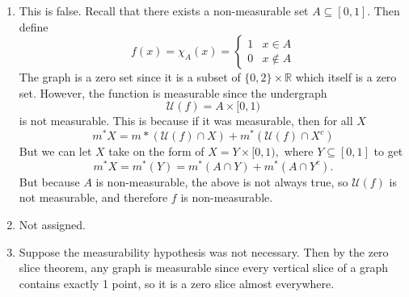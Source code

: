 \documentclass{article}
\begin{document}
\begin{enumerate}
\begin{enumerate}[label=(\alph*)]
        \item This is false. Recall that there exists a non-measurable set $A \subseteq [0,1].$ Then define 
        \begin{equation}
            f(x) = \chi_{A}(x) = \begin{cases}
                1 & x \in A \\ 
                0 & x \notin A
            \end{cases}
        \end{equation} 
        The graph is a zero set since it is a subset of $\{0,2\} \times \mathbb{R}$ which itself is a zero set. However, the function is measurable since the undergraph 
        \begin{equation}
            \mathcal{U}(f) = A \times [0,1)
        \end{equation}
        is not measurable. This is because if it was measurable, then for all $X$
        \begin{equation}
            m^*X = m*(\mathcal{U}(f) \cap X) + m^*(\mathcal{U}(f) \cap X^c)
        \end{equation}
        But we can let $X$ take on the form of $X = Y \times [0,1),$ where $Y\subseteq [0,1]$ to get 
        \begin{equation}
            m^*X = m^*(Y) = m^*(A \cap Y) + m^*(A \cap Y^c).
        \end{equation}
        But because $A$ is non-measurable, the above is not always true, so $\mathcal{U}(f)$ is not measurable, and therefore $f$ is non-measurable.
        \item Not assigned.
        \item Suppose the measurability hypothesis was not necessary. Then by the zero slice theorem, any graph is measurable since every vertical slice of a graph contains exactly 1 point, so it is a zero slice almost everywhere.
        

\end{enumerate}
\end{enumerate}
\end{document}
